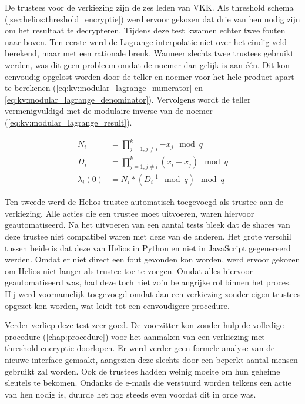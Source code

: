 \npar De trustees voor de verkiezing zijn de zes leden van VKK. Als threshold schema (\ref{sec:helios:threshold_encryptie}) werd ervoor gekozen dat drie van hen nodig zijn om het resultaat te decrypteren. Tijdens deze test kwamen echter twee fouten naar boven. Ten eerste werd de Lagrange-interpolatie niet over het eindig veld berekend, maar met een rationale breuk. Wanneer slechts twee trustees gebruikt werden, was dit geen probleem omdat de noemer dan gelijk is aan \'e\'en. Dit kon eenvoudig opgelost worden door de teller en noemer voor het hele product apart te berekenen (\ref{eq:kv:modular_lagrange_numerator} en \ref{eq:kv:modular_lagrange_denominator}). Vervolgens wordt de teller vermenigvuldigd met de modulaire inverse van de noemer (\ref{eq:kv:modular_lagrange_result}).

\begin{align}
  \label{eq:kv:modular_lagrange_numerator} 
  N_i & = \prod_{j=1, j\not=i}^k{-x_j} \mod{q} \\
  \label{eq:kv:modular_lagrange_denominator}
  D_i & = \prod_{j=1, j\not=i}^k{(x_i - x_j)} \mod{q} \\
  \label{eq:kv:modular_lagrange_result}
  \lambda{_i}(0) & = N_i * (D_i^{-1} \mod{q}) \mod{q}
\end{align}

\npar Ten tweede werd de Helios trustee automatisch toegevoegd als trustee aan de verkiezing. Alle acties die een trustee moet uitvoeren, waren hiervoor geautomatiseerd. Na het uitvoeren van een aantal tests bleek dat de shares van deze trustee niet compatibel waren met deze van de anderen. Het grote verschil tussen beide is dat deze van Helios in Python en niet in JavaScript gegenereerd werden. Omdat er niet direct een fout gevonden kon worden, werd ervoor gekozen om Helios niet langer als trustee toe te voegen. Omdat alles hiervoor geautomatiseerd was, had deze toch niet zo'n belangrijke rol binnen het proces. Hij werd voornamelijk toegevoegd omdat dan een verkiezing zonder eigen trustees opgezet kon worden, wat leidt tot een eenvoudigere procedure.

\npar Verder verliep deze test zeer goed. De voorzitter kon zonder hulp de volledige procedure (\ref{chap:procedure}) voor het aanmaken van een verkiezing met threshold encryptie doorlopen. Er werd verder geen formele analyse van de nieuwe interface gemaakt, aangezien deze slechts door een beperkt aantal mensen gebruikt zal worden. Ook de trustees hadden weinig moeite om hun geheime sleutels te bekomen. Ondanks de e-mails die verstuurd worden telkens een actie van hen nodig is, duurde het nog steeds even voordat dit in orde was.

